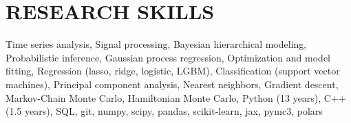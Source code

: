 \section{\large RESEARCH SKILLS}
Time series analysis, Signal processing, Bayesian hierarchical modeling, Probabilistic inference, Gaussian process regression, Optimization and model fitting, Regression (lasso, ridge, logistic, LGBM), Classification (support vector machines), Principal component analysis, Nearest neighbors, Gradient descent, Markov-Chain Monte Carlo, Hamiltonian Monte Carlo, Python (13 years), C++ (1.5 years), SQL, git, numpy, scipy, pandas, scikit-learn, jax, pymc3, polars